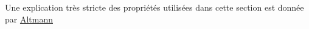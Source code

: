 Une explication très stricte des propriétés utilisées dans cette section est 
donnée par \href{http://www.simonaltmann.com/Simon_Altmann/Welcome.html}{Altmann}